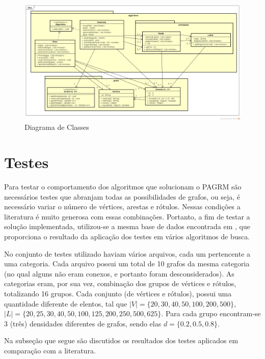 \documentclass[12pt]{article}
\begin{document}
		\begin{landscape}
		\centering
		\begin{figure}[p]
		\includegraphics[width=1.4\textwidth]{ClassDiagram.png}
		\caption{Diagrama de Classes}
		\label{fig:classDiagram}
		\end{figure}
		\end{landscape}
		\restoregeometry

\section{Testes}\label{sec:testes}
	
	Para testar o comportamento dos algoritmos que solucionam o PAGRM são necessários testes que abranjam todas as possibilidades de grafos, ou seja, é necessário variar o número de vértices, arestas e rótulos. Nessas condições a literatura é muito generosa com essas combinações. Portanto, a fim de testar a solução implementada, utilizou-se a mesma base de dados encontrada em \cite{cerulli:2005}, que proporciona o resultado da aplicação dos testes em vários algoritmos de busca.

	No conjunto de testes utilizado haviam vários arquivos, cada um pertencente a uma categoria. Cada arquivo possui um total de 10 grafos da mesma categoria (no qual alguns não eram conexos, e portanto foram desconsiderados). As categorias eram, por sua vez, combinação dos grupos de vértices e rótulos, totalizando 16 grupos. Cada conjunto (de vértices e rótulos), possui uma quantidade diferente de elentos, tal que $|V| = \{20, 30, 40, 50, 100, 200, 500\}$, $|L| = \{20, 25, 30, 40, 50, 100, 125, 200, 250, 500, 625\}$. Para cada grupo encontram-se 3 (três) densidades diferentes de grafos, sendo elas $d = \{0.2, 0.5, 0.8\}$.

	Na subseção que segue são discutidos os resultados dos testes aplicados em comparação com a literatura.
\end{document}
